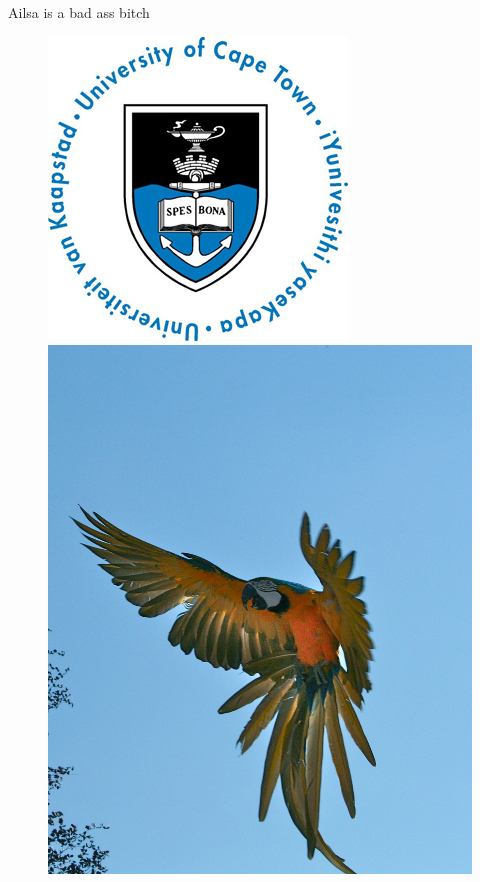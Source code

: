 Ailsa is a bad ass bitch\\
\begin{figure}[!]
	\centering
	\includegraphics[scale=0.8]{Figures/small.jpg}
	\includegraphics[scale=0.07]{Figures/fly.jpg}

\end{figure}
